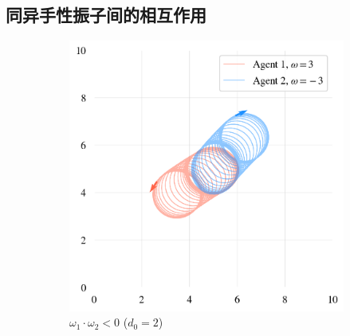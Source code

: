 \documentclass{article}
\begin{document}
\subsection{同异手性振子间的相互作用}

\begin{figure}[H]
	\centering

	\begin{subfigure}[b]{0.49\textwidth}
		\includegraphics[width=\textwidth]{./figs/diffChir.png}
		\vspace{-1cm}
		\caption{$\omega_1 \cdot \omega_2 < 0$ ($d_0=2$)}
	\end{subfigure}
	\begin{subfigure}[b]{0.49\textwidth}

\end{subfigure}
\end{figure}
\end{document}
